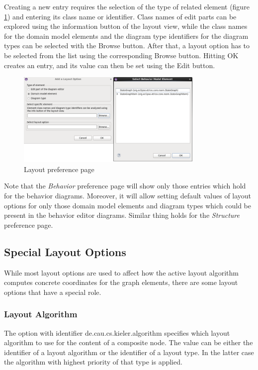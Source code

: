 Creating a new entry requires the selection of the type of related element (figure \ref{fig_layout_preference_page})
and entering its class name or 
identifier. Class names of edit parts can be explored using the information button of the layout view, 
while the class names for the domain model elements and the diagram type identifiers for the diagram types 
can be selected with the Browse button. After that, a layout option has to be selected from the list using 
the corresponding Browse button. Hitting OK creates an entry, and its value can then be set using the Edit 
button.

\begin{figure}
\includegraphics[width=0.8\textwidth]{images/043-PreferencePage.png}
\caption{Layout preference page}
\label{fig_layout_preference_page}
\end{figure}

Note that the \textit{Behavior} preference page will show only those entries which hold for the behavior 
diagrams. Moreover, it will allow setting default values of layout options for only those domain model 
elements and diagram types which could be present in the behavior editor diagrams. Similar thing holds for 
the \textit{Structure} preference page.

\subsection{Special Layout Options}
\label{specialOptions}

While most layout options are used to affect how the active layout algorithm computes concrete coordinates 
for the graph elements, there are some layout options that have a special role.

\subsubsection*{Layout Algorithm}

The option with identifier de.cau.cs.kieler.algorithm specifies which layout algorithm to use for the 
content of a composite node. The value can be either the identifier of a layout algorithm or the 
identifier of a layout type. In the latter case the algorithm with highest priority of that type is applied.

